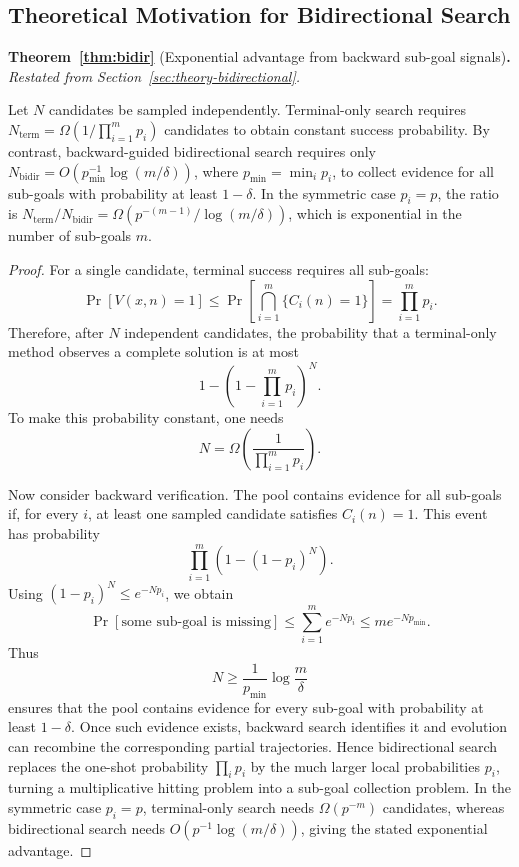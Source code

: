 \documentclass{llmxive}
\begin{document}
\subsection{Theoretical Motivation for Bidirectional Search}
\label{app:theory-bidirectional}

\noindent\textbf{Theorem~\ref{thm:bidir}} (Exponential advantage from backward sub-goal signals)\textbf{.}
\textit{Restated from Section~\ref{sec:theory-bidirectional}.}
\medskip

\noindent Let $N$ candidates be sampled independently. Terminal-only search requires
$N_{\mathrm{term}} = \Omega\!\left(1 / \prod_{i=1}^m p_i\right)$
candidates to obtain constant success probability. By contrast, backward-guided bidirectional search requires only
$N_{\mathrm{bidir}} = O\!\left(p_{\min}^{-1}\log(m/\delta)\right)$,
where $p_{\min}=\min_i p_i$,
to collect evidence for all sub-goals with probability at least $1-\delta$. In the symmetric case $p_i=p$, the ratio is
$N_{\mathrm{term}} / N_{\mathrm{bidir}} = \Omega\!\left(p^{-(m-1)} / \log(m/\delta)\right)$,
which is exponential in the number of sub-goals $m$.

\begin{proof}
For a single candidate, terminal success requires all sub-goals:
\[
  \Pr[V(x,n)=1]
  \le
  \Pr\!\left[\bigcap_{i=1}^m \{C_i(n)=1\}\right]
  =
  \prod_{i=1}^m p_i.
\]
Therefore, after \(N\) independent candidates, the probability that a
terminal-only method observes a complete solution is at most
\[
  1-\left(1-\prod_{i=1}^m p_i\right)^N.
\]
To make this probability constant, one needs
\[
  N=\Omega\!\left(\frac{1}{\prod_{i=1}^m p_i}\right).
\]

Now consider backward verification. The pool contains evidence for all
sub-goals if, for every \(i\), at least one sampled candidate satisfies
\(C_i(n)=1\). This event has probability
\[
  \prod_{i=1}^m \left(1-(1-p_i)^N\right).
\]
Using \((1-p_i)^N\le e^{-Np_i}\), we obtain
\[
  \Pr[\text{some sub-goal is missing}]
  \le
  \sum_{i=1}^m e^{-Np_i}
  \le
  m e^{-N p_{\min}}.
\]
Thus
\[
  N\ge \frac{1}{p_{\min}}\log\frac{m}{\delta}
\]
ensures that the pool contains evidence for every sub-goal with probability at
least \(1-\delta\). Once such evidence exists, backward search identifies it
and evolution can recombine the corresponding partial trajectories. Hence
bidirectional search replaces the one-shot probability
\(\prod_i p_i\) by the much larger local probabilities \(p_i\), turning a
multiplicative hitting problem into a sub-goal collection problem. In the
symmetric case \(p_i=p\), terminal-only search needs
\(\Omega(p^{-m})\) candidates, whereas bidirectional search needs
\(O(p^{-1}\log(m/\delta))\), giving the stated exponential advantage.
\end{proof}
\end{document}
